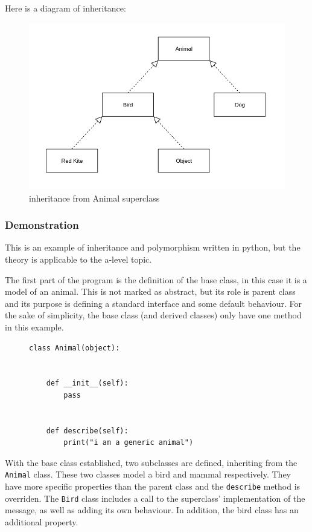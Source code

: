 \documentclass[9pt]{article}
\begin{document}
Here is a diagram of inheritance:

\begin{figure}[htbp]
\centering
\includegraphics[width=.9\linewidth]{./images/inheritance.png}
\caption{inheritance from Animal superclass}
\end{figure}

\subsubsection{Demonstration}
\label{sec:orga93ad3b}

This is an example of inheritance and polymorphism written in python, but the theory is applicable to the a-level topic.

The first part of the program is the definition of the base class, in this case it is a model of an animal. This is not marked as abstract, but its role is parent class and its purpose is defining a standard interface and some default behaviour. For the sake of simplicity, the base class (and derived classes) only have one method in this example.

\begin{figure}[H]
\begin{verbatim}
class Animal(object):


    def __init__(self):
        pass


    def describe(self):
        print("i am a generic animal")
\end{verbatim}
\end{figure}

With the base class established, two subclasses are defined, inheriting from the \texttt{Animal} class. These two classes model a bird and mammal respectively. They have more specific properties than the parent class and the \texttt{describe} method is overriden. The \texttt{Bird} class includes a call to the superclass' implementation of the message, as well as adding its own behaviour. In addition, the bird class has an additional property.
\end{document}
